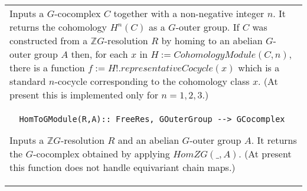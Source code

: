 \documentclass[a4paper,11pt]{report}
\begin{document}
{\begin{center}
\begin{tabular}{|l|}
 

 Inputs a $G$-cocomplex $C$ together with a non-negative integer $n$. It returns the cohomology $H^n(C)$ as a $G$-outer group. If $C$ was constructed from a $\mathbb ZG$-resolution $R$ by homing to an abelian $G$-outer group $A$ then, for each $x$ in $H:=CohomologyModule(C,n)$, there is a function $f:=H!.representativeCocycle(x)$ which is a standard $n$-cocycle corresponding to the cohomology class $x$. (At present this is implemented only for $n=1,2,3$.) \\
 \index{HomToGModule} 
\begin{verbatim}  HomToGModule(R,A):: FreeRes, GOuterGroup --> GCocomplex
\end{verbatim}


 

 Inputs a $\mathbb ZG$-resolution $R$ and an abelian $G$-outer group $A$. It returns the $G$-cocomplex obtained by applying $HomZG( \_ , A)$. (At present this function does not handle equivariant chain maps.) \\
\end{tabular}\\[2mm]
\end{center}

 }

 
\end{document}
